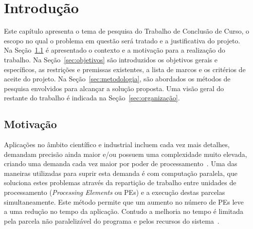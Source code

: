 \chapter{Introdução}

Este capítulo apresenta o tema de pesquisa do Trabalho de Conclusão de Curso, o escopo no qual o problema em questão será tratado e a justificativa do projeto. 
Na Seção~\ref{sec:introducao} é apresentado o contexto e a motivação para a realização do trabalho. 
Na Seção~\ref{sec:objetivos} são introduzidos os objetivos gerais e específicos, as restrições e premissas existentes, a lista de marcos e os critérios de aceite do projeto. 
Na Seção~\ref{sec:metodologia}, são abordados os métodos de pesquisa envolvidos para alcançar a solução proposta.
Uma visão geral do restante do trabalho é indicada na Seção~\ref{sec:organização}.


\section{Motivação}
\label{sec:introducao}

Aplicações no âmbito científico e industrial incluem cada vez mais detalhes, demandam precisão ainda maior e/ou possuem uma complexidade muito elevada, criando uma demanda cada vez maior por poder de processamento~\cite{pilla-thesis}. Uma das maneiras utilizadas para suprir esta demanda é com computação paralela, que soluciona estes problemas através da repartição de trabalho entre unidades de processamento (\textit{Processing Elements} ou PEs) e a execução destas parcelas simultaneamente. Este método permite que um aumento no número de PEs leve a uma redução no tempo da aplicação. Contudo a melhoria no tempo é limitada pela parcela não paralelizável do programa e pelos recursos do sistema~\cite{amdahl}. 


